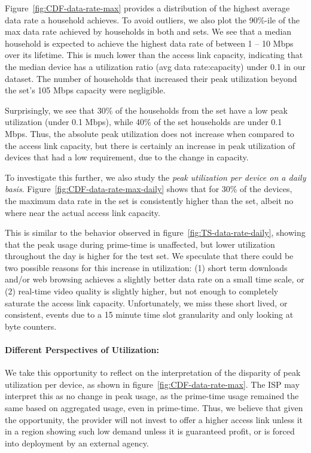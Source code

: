 Figure~\ref{fig:CDF-data-rate-max} provides a distribution of the highest average
data rate a household achieves. To avoid outliers, we also plot the 90\%-ile of the max
data rate achieved by households in both \test and \control sets. We see that a median
household is expected to achieve the highest data rate of between 1 -- 10 Mbps over its
lifetime. This is much lower than the access link capacity,
indicating that the median device has a utilization ratio (avg data rate:capacity) under
0.1 in our dataset. The number of households that increased their peak utilization beyond
the \control set's 105 Mbps capacity were negligible.

Surprisingly, we see that 30\% of the households from the \test set have a low peak
utilization (under 0.1 Mbps), while 40\% of the \control set households are under 0.1 Mbps.
Thus, the absolute peak utilization does not increase when compared to the access link
capacity, but there is certainly an increase in peak utilization of devices that had a low
requirement, due to the change in capacity.

To investigate this further, we also study the \emph{peak utilization per device on a daily basis}.
Figure~\ref{fig:CDF-data-rate-max-daily} shows that for 30\% of the devices,
the maximum data rate in the \test set is consistently higher than the \control set, albeit
no where near the actual access link capacity.

This is similar to the behavior observed in figure~\ref{fig:TS-data-rate-daily}, showing that the peak
usage during prime-time is unaffected, but lower utilization throughout the day is higher
for the test set. We speculate that there could be two possible reasons for this increase
in utilization: (1) short term downloads and/or web browsing achieves a slightly better
data rate on a small time scale, or (2) real-time video quality is slightly higher, but
not enough to completely saturate the access link capacity. Unfortunately, we miss these
short lived, or consistent, events due to a 15 minute time slot granularity and only
looking at byte counters.


\paragraph{Different Perspectives of Utilization: }We take this opportunity to reflect on the
interpretation of the disparity of peak utilization per device, as shown in
figure~\ref{fig:CDF-data-rate-max}. The ISP may interpret this as no change in peak usage, as
the prime-time usage remained the same based on aggregated usage, even in prime-time. Thus, we
believe that given the opportunity, the provider will not invest to offer a higher access
link unless it in a region showing such low demand unless it is guaranteed profit, or is forced
into deployment by an external agency.

